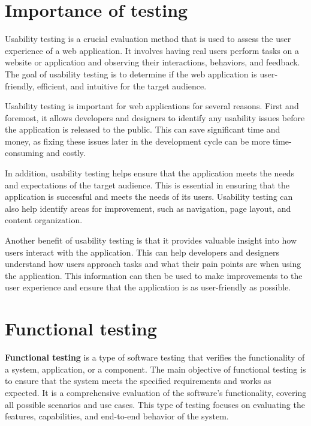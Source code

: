 \section{Importance of testing}
Usability testing is a crucial evaluation method that is used to assess the user 
experience of a web application. It involves having real users perform tasks on a 
website or application and observing their interactions, behaviors, and feedback. 
The goal of usability testing is to determine if the web application is user-friendly, 
efficient, and intuitive for the target audience.

Usability testing is important for web applications for several reasons. First and 
foremost, it allows developers and designers to identify any usability issues before 
the application is released to the public. This can save significant time and money, 
as fixing these issues later in the development cycle can be more time-consuming and costly.

In addition, usability testing helps ensure that the application meets the needs 
and expectations of the target audience. This is essential in ensuring that the 
application is successful and meets the needs of its users. Usability testing 
can also help identify areas for improvement, such as navigation, page layout, 
and content organization.

Another benefit of usability testing is that it provides valuable insight 
into how users interact with the application. This can help developers 
and designers understand how users approach tasks and what their pain 
points are when using the application. This information can then be 
used to make improvements to the user experience and ensure that 
the application is as user-friendly as possible.

\section{Functional testing}
\textbf{Functional testing} is a type of software testing that verifies the functionality of a system, application, or a component. 
The main objective of functional testing is to ensure that the system meets the specified requirements and works as expected. 
It is a comprehensive evaluation of the software's functionality, covering all possible scenarios and use cases. 
This type of testing focuses on evaluating the features, capabilities, and end-to-end behavior of the system.


